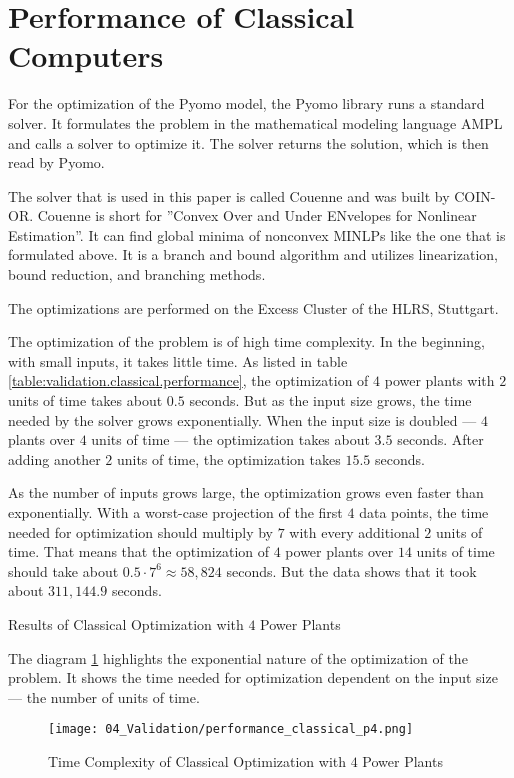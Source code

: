 \section{Performance of Classical Computers}

For the optimization of the Pyomo model, the Pyomo library runs a standard solver.
It formulates the problem in the mathematical modeling language AMPL
and calls a solver to optimize it.
The solver returns the solution, which is then read by Pyomo.
\cite{PyomoAMPL}

The solver that is used in this paper is called Couenne and was built by COIN-OR.
Couenne is short for ''Convex Over and Under ENvelopes for Nonlinear Estimation''.
It can find global minima of nonconvex MINLPs like the one that is formulated above.
It is a branch and bound algorithm and utilizes linearization, bound reduction, and branching methods.
\cite{Belotti2009,CoinorHome,CouenneRepo}

The optimizations are performed on the Excess Cluster of the HLRS, Stuttgart.
\cite{ExcessHLRS,HLRS}

The optimization of the problem is of high time complexity.
In the beginning, with small inputs, it takes little time.
As listed in table \ref{table:validation.classical.performance}, the optimization of $4$ power plants with $2$ units of time takes about $0.5$ seconds.
But as the input size grows, the time needed by the solver grows exponentially.
When the input size is doubled --- $4$ plants over $4$ units of time --- the optimization takes about $3.5$ seconds.
After adding another $2$ units of time, the optimization takes $15.5$ seconds.

As the number of inputs grows large, the optimization grows even faster than exponentially.
With a worst-case projection of the first $4$ data points, the time needed for optimization should multiply by $7$ with every additional $2$ units of time.
That means that the optimization of $4$ power plants over $14$ units of time should take about $0.5 \cdot 7^6 \approx 58,824$ seconds.
But the data shows that it took about $311,144.9$ seconds.

\begin{table}[ht]
  \centering
  
  \caption{Results of Classical Optimization with $4$ Power Plants}
  \label{table:validation.classical.performance}
\end{table}

The diagram \ref{figure:validation.classical.performance} highlights the exponential nature of the optimization of the problem.
It shows the time needed for optimization dependent on the input size --- the number of units of time.

\begin{figure}[ht]
  \centering
  \texttt{[image: 04\_Validation/performance\_classical\_p4.png]}
  \caption{Time Complexity of Classical Optimization with $4$ Power Plants}
  \label{figure:validation.classical.performance}
\end{figure}

